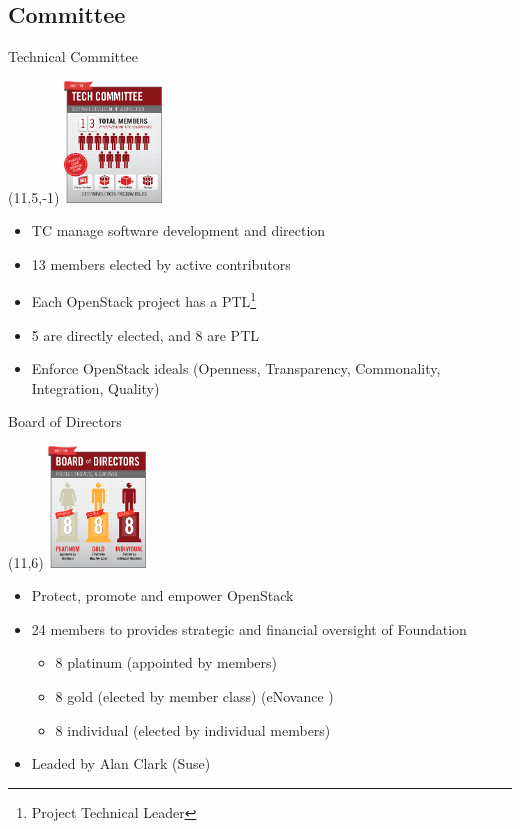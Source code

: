 \subsection{Committee}
\begin{frame}{Technical Committee}
  \begin{textblock}{}(11.5,-1)
      \includegraphics[width=7em]{img/osgraphictech}
  \end{textblock}
  \begin{itemize}
    \item TC manage software development and direction
      \medskip
    \item 13 members elected by active contributors
      \medskip
    \item Each OpenStack project has a PTL\footnote{Project Technical Leader}
      \medskip
    \item 5 are directly elected, and 8 are PTL
      \medskip
    \item Enforce OpenStack ideals (Openness, Transparency, Commonality, Integration, Quality)
  \end{itemize}
\end{frame}

\begin{frame}{Board of Directors}
  \begin{textblock}{}(11,6)
      \includegraphics[width=7em]{img/osgraphicboard}
  \end{textblock}
  \begin{itemize}
    \item Protect, promote and empower OpenStack
      \medskip
    \item 24 members to provides strategic and financial oversight of Foundation
      \begin{itemize}
        \item 8 platinum (appointed by members)
        \item 8 gold (elected by member class) (eNovance \Smiley)
        \item 8 individual (elected by individual members)
      \end{itemize}
      \medskip
    \item Leaded by Alan Clark (Suse)
  \end{itemize}
\end{frame}

